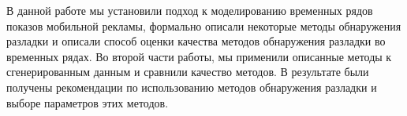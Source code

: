 \documentclass[%
12pt,
master,  %
natbib,      %
subf,        %
substylefile = spbu.rtx,
href,        %
colorlinks,  %
]{disser}
\begin{document}
%
%



\conclusion
В данной работе мы установили подход к моделированию временных рядов показов мобильной рекламы, формально описали некоторые методы обнаружения разладки и описали способ оценки качества методов обнаружения разладки во временных рядах. Во второй части работы, мы применили описанные методы к сгенерированным данным и сравнили качество методов. В результате были получены рекомендации по использованию методов обнаружения разладки и выборе параметров этих методов.
%

%


%

% 
\end{document}
